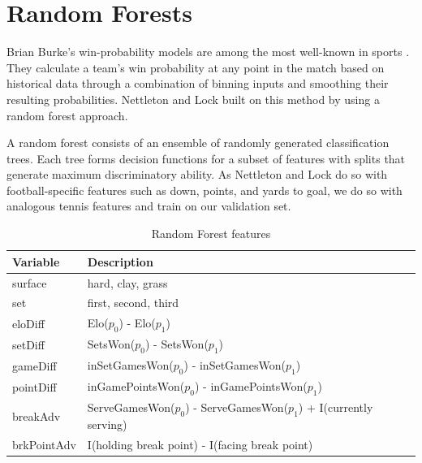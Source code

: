 \documentclass[chapterprefix=false]{report}
\begin{document}



\section{Random Forests}
Brian Burke's win-probability models are among the most well-known in sports \cite{Burke2014}. They calculate a team's win probability at any point in the match based on historical data through a combination of binning inputs and smoothing their resulting probabilities. Nettleton and Lock built on this method by using a random forest approach.

A random forest consists of an ensemble of randomly generated classification trees. Each tree forms decision functions for a subset of features with splits that generate maximum discriminatory ability. As Nettleton and Lock do so with football-specific features such as down, points, and yards to goal, we do so with analogous tennis features and train on our validation set.



\begin{table}[H]
\centering
\caption{Random Forest features}
\label{my-label}
\begin{tabular}{ll}
 \hline
 Variable & Description \\
 \hline
 surface & hard, clay, grass \\
 \hline
 set &  first, second, third \\
 \hline
 eloDiff &  Elo($p_0$) - Elo($p_1$) \\
 \hline
  setDiff &  SetsWon($p_0$) - SetsWon($p_1$)\\
 \hline
 gameDiff &  inSetGamesWon($p_0$) - inSetGamesWon($p_1$)\\
 \hline
 pointDiff &  inGamePointsWon($p_0$) - inGamePointsWon($p_1$)\\
 \hline
  breakAdv &  ServeGamesWon($p_0$) - ServeGamesWon($p_1$) + I(currently serving)\\
 \hline
 brkPointAdv & I(holding break point) - I(facing break point)\\
 \hline
\end{tabular}
\end{table}
\end{document}

